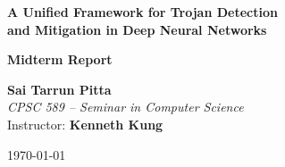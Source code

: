 \documentclass[12pt, letterpaper]{article}
\begin{document}
\begin{titlepage}
  \thispagestyle{empty}
  \centering
  \vspace*{2.5cm}

  {\LARGE\bfseries A Unified Framework for Trojan Detection\\[0.3em]
  and Mitigation in Deep Neural Networks\par}

  \vspace{0.5em}
  {\large\bfseries Midterm Report\par}

  \vspace{2.5cm}

  {\large
    \textbf{Sai Tarrun Pitta}\\[0.3em]
    \textit{CPSC 589 -- Seminar in Computer Science}\\[0.3em]
    Instructor: \textbf{Kenneth Kung}
  }

  \vfill
  {\normalsize \today}
\end{titlepage}

\setcounter{page}{1}
\pagestyle{plain}

\tableofcontents
\clearpage
\listoffigures
\clearpage
\listoftables
\clearpage

\pagestyle{fancy}
\setcounter{page}{1}
\end{document}
